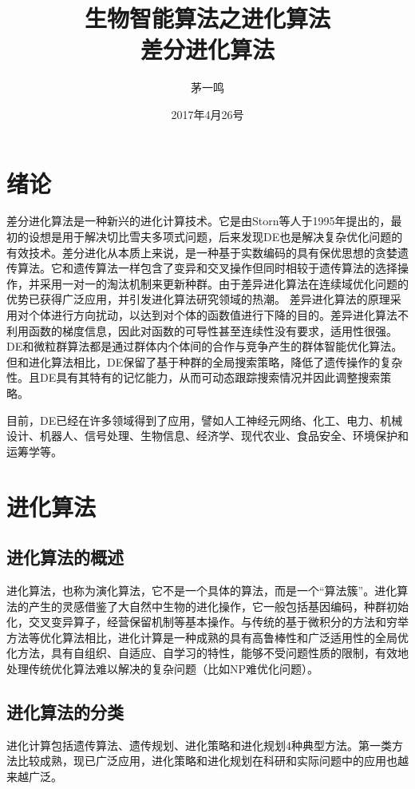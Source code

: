 \documentclass[12pt]{article}
\begin{document}
\title{生物智能算法之进化算法\\差分进化算法}
\author{茅一鸣}
\date{2017年4月26号}
\maketitle

\tableofcontents

\section{绪论}
差分进化算法是一种新兴的进化计算技术。它是由Storn等人于1995年提出的，最初的设想是用于解决切比雪夫多项式问题，后来发现DE也是解决复杂优化问题的有效技术。差分进化从本质上来说，是一种基于实数编码的具有保优思想的贪婪遗传算法。它和遗传算法一样包含了变异和交叉操作但同时相较于遗传算法的选择操作，并采用一对一的淘汰机制来更新种群。由于差异进化算法在连续域优化问题的优势已获得广泛应用，并引发进化算法研究领域的热潮。 差异进化算法的原理采用对个体进行方向扰动，以达到对个体的函数值进行下降的目的。差异进化算法不利用函数的梯度信息，因此对函数的可导性甚至连续性没有要求，适用性很强。DE和微粒群算法都是通过群体内个体间的合作与竞争产生的群体智能优化算法。但和进化算法相比，DE保留了基于种群的全局搜索策略，降低了遗传操作的复杂性。且DE具有其特有的记忆能力，从而可动态跟踪搜索情况并因此调整搜索策略。

目前，DE已经在许多领域得到了应用，譬如人工神经元网络、化工、电力、机械设计、机器人、信号处理、生物信息、经济学、现代农业、食品安全、环境保护和运筹学等。

\section{进化算法}
\subsection{进化算法的概述}
进化算法，也称为演化算法，它不是一个具体的算法，而是一个“算法簇”。进化算法的产生的灵感借鉴了大自然中生物的进化操作，它一般包括基因编码，种群初始化，交叉变异算子，经营保留机制等基本操作。与传统的基于微积分的方法和穷举方法等优化算法相比，进化计算是一种成熟的具有高鲁棒性和广泛适用性的全局优化方法，具有自组织、自适应、自学习的特性，能够不受问题性质的限制，有效地处理传统优化算法难以解决的复杂问题（比如NP难优化问题）。

\subsection{进化算法的分类}
进化计算包括遗传算法、遗传规划、进化策略和进化规划4种典型方法。第一类方法比较成熟，现已广泛应用，进化策略和进化规划在科研和实际问题中的应用也越来越广泛。
\end{document}
